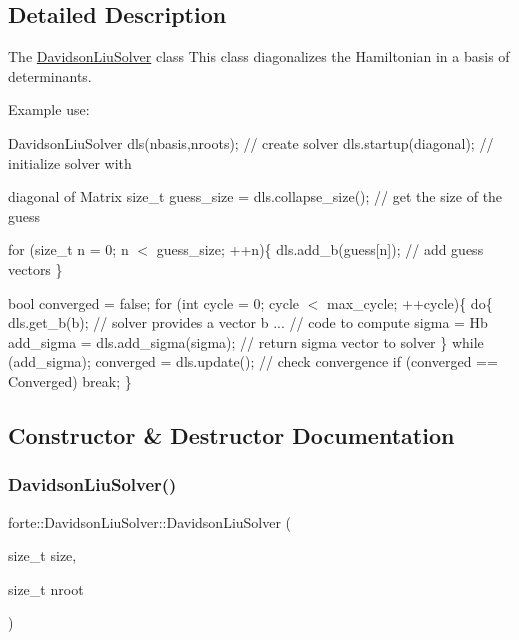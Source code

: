 \subsection{Detailed Description}
The \mbox{\hyperlink{classforte_1_1_davidson_liu_solver}{Davidson\+Liu\+Solver}} class This class diagonalizes the Hamiltonian in a basis of determinants. 

Example use\+: \begin{DoxyVerb}DavidsonLiuSolver dls(nbasis,nroots);      // create solver
dls.startup(diagonal);                     // initialize solver with
\end{DoxyVerb}
 diagonal of Matrix size\+\_\+t guess\+\_\+size = dls.\+collapse\+\_\+size(); // get the size of the guess

for (size\+\_\+t n = 0; n $<$ guess\+\_\+size; ++n)\{ dls.\+add\+\_\+b(guess\mbox{[}n\mbox{]}); // add guess vectors \}

bool converged = false; for (int cycle = 0; cycle $<$ max\+\_\+cycle; ++cycle)\{ do\{ dls.\+get\+\_\+b(b); // solver provides a vector b ... // code to compute sigma = Hb add\+\_\+sigma = dls.\+add\+\_\+sigma(sigma); // return sigma vector to solver \} while (add\+\_\+sigma); converged = dls.\+update(); // check convergence if (converged == Converged) break; \} 

\subsection{Constructor \& Destructor Documentation}
\mbox{\label{classforte_1_1_davidson_liu_solver_a1b843c1999b520d6bd65e68db087a78d}} 
\subsubsection{\texorpdfstring{Davidson\+Liu\+Solver()}{DavidsonLiuSolver()}}
{\footnotesize\ttfamily forte\+::\+Davidson\+Liu\+Solver\+::\+Davidson\+Liu\+Solver (\begin{DoxyParamCaption}\item[{size\+\_\+t}]{size,  }\item[{size\+\_\+t}]{nroot }\end{DoxyParamCaption})}



